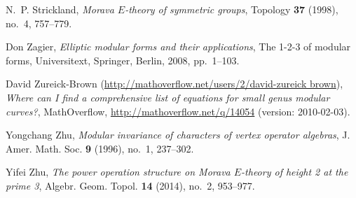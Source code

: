 \documentclass{gtpart}
\theoremstyle{definition}
\theoremstyle{remark}
\renewcommand{\=}{\approx}
\renewcommand{\-}{\sim}
\numberwithin{equation}{section}
\numberwithin{thm}{section}
\begin{document}
\begin{thebibliography}
N.~P. Strickland, \emph{Morava {$E$}-theory of symmetric groups}, Topology
  \textbf{37} (1998), no.~4, 757--779. 

Don Zagier, \emph{Elliptic modular forms and their applications}, The 1-2-3 of
  modular forms, Universitext, Springer, Berlin, 2008, pp.~1--103. 

David Zureick-Brown (\href{http://mathoverflow.net/users/2/david-zureick brown}{http://mathoverflow.net/users/2/david-zureick brown}),
  \emph{Where can {I} find a comprehensive list of equations for small genus
  modular curves?}, MathOverflow, \href{http://mathoverflow.net/q/14054}{http://mathoverflow.net/q/14054} (version:
  2010-02-03).

Yongchang Zhu, \emph{Modular invariance of characters of vertex operator
  algebras}, J. Amer. Math. Soc. \textbf{9} (1996), no.~1, 237--302.

Yifei Zhu, \emph{The power operation structure on {M}orava {$E$}-theory of
  height 2 at the prime 3}, Algebr. Geom. Topol. \textbf{14} (2014), no.~2,
  953--977. 

\end{thebibliography}
\end{document}
